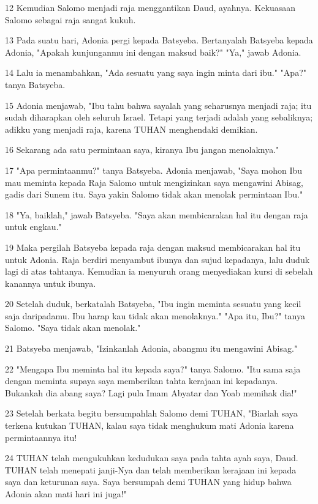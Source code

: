 \par 12 Kemudian Salomo menjadi raja menggantikan Daud, ayahnya. Kekuasaan Salomo sebagai raja sangat kukuh.
\par 13 Pada suatu hari, Adonia pergi kepada Batsyeba. Bertanyalah Batsyeba kepada Adonia, "Apakah kunjunganmu ini dengan maksud baik?" "Ya," jawab Adonia.
\par 14 Lalu ia menambahkan, "Ada sesuatu yang saya ingin minta dari ibu." "Apa?" tanya Batsyeba.
\par 15 Adonia menjawab, "Ibu tahu bahwa sayalah yang seharusnya menjadi raja; itu sudah diharapkan oleh seluruh Israel. Tetapi yang terjadi adalah yang sebaliknya; adikku yang menjadi raja, karena TUHAN menghendaki demikian.
\par 16 Sekarang ada satu permintaan saya, kiranya Ibu jangan menolaknya."
\par 17 "Apa permintaanmu?" tanya Batsyeba. Adonia menjawab, "Saya mohon Ibu mau meminta kepada Raja Salomo untuk mengizinkan saya mengawini Abisag, gadis dari Sunem itu. Saya yakin Salomo tidak akan menolak permintaan Ibu."
\par 18 "Ya, baiklah," jawab Batsyeba. "Saya akan membicarakan hal itu dengan raja untuk engkau."
\par 19 Maka pergilah Batsyeba kepada raja dengan maksud membicarakan hal itu untuk Adonia. Raja berdiri menyambut ibunya dan sujud kepadanya, lalu duduk lagi di atas tahtanya. Kemudian ia menyuruh orang menyediakan kursi di sebelah kanannya untuk ibunya.
\par 20 Setelah duduk, berkatalah Batsyeba, "Ibu ingin meminta sesuatu yang kecil saja daripadamu. Ibu harap kau tidak akan menolaknya." "Apa itu, Ibu?" tanya Salomo. "Saya tidak akan menolak."
\par 21 Batsyeba menjawab, "Izinkanlah Adonia, abangmu itu mengawini Abisag."
\par 22 "Mengapa Ibu meminta hal itu kepada saya?" tanya Salomo. "Itu sama saja dengan meminta supaya saya memberikan tahta kerajaan ini kepadanya. Bukankah dia abang saya? Lagi pula Imam Abyatar dan Yoab memihak dia!"
\par 23 Setelah berkata begitu bersumpahlah Salomo demi TUHAN, "Biarlah saya terkena kutukan TUHAN, kalau saya tidak menghukum mati Adonia karena permintaannya itu!
\par 24 TUHAN telah mengukuhkan kedudukan saya pada tahta ayah saya, Daud. TUHAN telah menepati janji-Nya dan telah memberikan kerajaan ini kepada saya dan keturunan saya. Saya bersumpah demi TUHAN yang hidup bahwa Adonia akan mati hari ini juga!"
